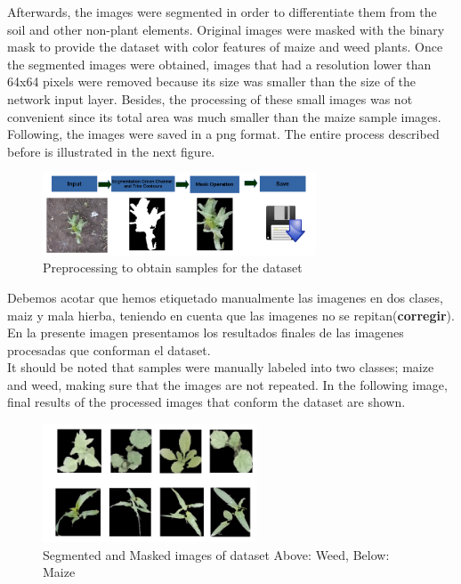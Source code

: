 \documentclass[conference]{IEEEtran}
\begin{document}
Afterwards, the images were segmented in order to differentiate them from the soil and other non-plant elements. Original images were masked with the binary mask to provide the dataset with color features of maize and weed plants. Once the segmented images were obtained, images that had a resolution lower than 64x64 pixels were removed because its size was smaller than the size of the network input layer. Besides, the processing of these small images was not convenient since its total area was much smaller than the maize sample images. Following, the images were saved in a png format. The entire process described before is illustrated in the next figure. \\

	\begin{figure}[h]
	\centering
	\includegraphics[width=3.2in]{procesamiento}
	\caption{Preprocessing to obtain samples for the dataset}
	\label{fig_sim}
	\end{figure}
	
Debemos acotar que hemos etiquetado manualmente las imagenes en dos clases, maiz y mala hierba, teniendo en cuenta que las imagenes no se repitan(\textbf{corregir}). En la presente imagen presentamos los resultados finales de las imagenes procesadas que conforman el dataset.    \\

It should be noted that samples were manually labeled into two classes; maize and weed, making sure that the images are not repeated. In the following image, final results of the processed images that conform the dataset are shown.\\
	
	\begin{figure}[h]
	\centering
	\includegraphics[width=2.5in]{im1}
	\caption{ Segmented and Masked images of dataset Above: Weed, Below: Maize}
	\label{fig_sim}
	\end{figure}
	
\end{document}
